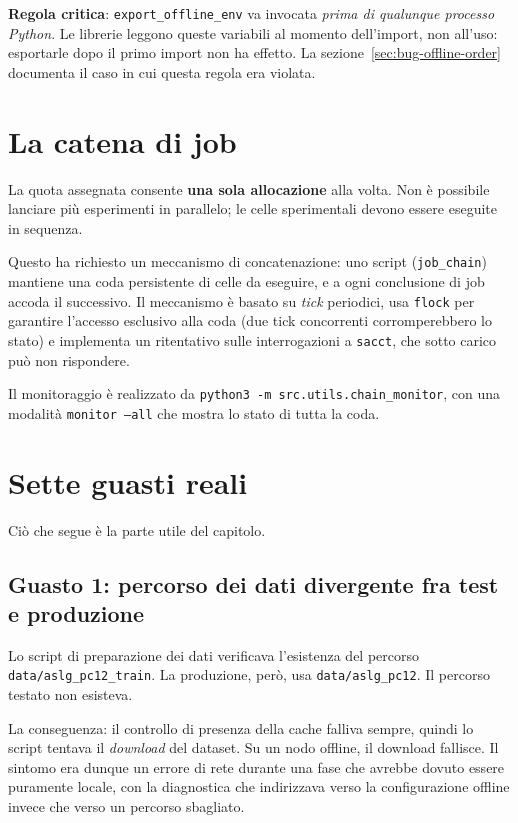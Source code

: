 \textbf{Regola critica}: \texttt{export\_offline\_env} va invocata
\emph{prima di qualunque processo Python}. Le librerie leggono queste variabili
al momento dell'import, non all'uso: esportarle dopo il primo import non ha
effetto. La sezione~\ref{sec:bug-offline-order} documenta il caso in cui questa
regola era violata.

\section{La catena di job}

La quota assegnata consente \textbf{una sola allocazione} alla volta. Non è
possibile lanciare più esperimenti in parallelo; le celle sperimentali devono
essere eseguite in sequenza.

Questo ha richiesto un meccanismo di concatenazione: uno script
(\texttt{job\_chain}) mantiene una coda persistente di celle da eseguire, e a
ogni conclusione di job accoda il successivo. Il meccanismo è basato su
\emph{tick} periodici, usa \texttt{flock} per garantire l'accesso esclusivo alla
coda (due tick concorrenti corromperebbero lo stato) e implementa un ritentativo
sulle interrogazioni a \texttt{sacct}, che sotto carico può non rispondere.

Il monitoraggio è realizzato da \texttt{python3 -m src.utils.chain\_monitor}, con
una modalità \texttt{monitor --all} che mostra lo stato di tutta la coda.

\section{Sette guasti reali}

Ciò che segue è la parte utile del capitolo.

\subsection{Guasto 1: percorso dei dati divergente fra test e produzione}

Lo script di preparazione dei dati verificava l'esistenza del percorso
\texttt{data/aslg\_pc12\_train}. La produzione, però, usa
\texttt{data/aslg\_pc12}. Il percorso testato non esisteva.

La conseguenza: il controllo di presenza della cache falliva sempre, quindi lo
script tentava il \emph{download} del dataset. Su un nodo offline, il download
fallisce. Il sintomo era dunque un errore di rete durante una fase che avrebbe
dovuto essere puramente locale, con la diagnostica che indirizzava verso la
configurazione offline invece che verso un percorso sbagliato.

